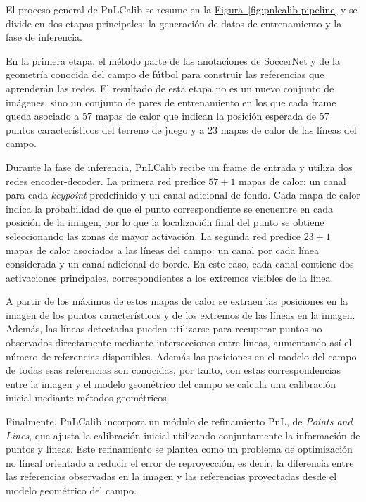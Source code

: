 El proceso general de PnLCalib se resume en la \hyperref[fig:pnlcalib-pipeline]{Figura~\ref*{fig:pnlcalib-pipeline}} y se divide en dos etapas principales: la generación de datos de entrenamiento y la fase de inferencia.

En la primera etapa, el método parte de las anotaciones de SoccerNet y de la geometría conocida del campo de fútbol para construir las referencias que aprenderán las redes. El resultado de esta etapa no es un nuevo conjunto de imágenes, sino un conjunto de pares de entrenamiento en los que cada frame queda asociado a 57 mapas de calor que indican la posición esperada de 57 puntos característicos del terreno de juego y a 23 mapas de calor de las líneas del campo.

Durante la fase de inferencia, PnLCalib recibe un frame de entrada y utiliza dos redes encoder-decoder. La primera red predice $57+1$ mapas de calor: un canal para cada \textit{keypoint} predefinido y un canal adicional de fondo. Cada mapa de calor indica la probabilidad de que el punto correspondiente se encuentre en cada posición de la imagen, por lo que la localización final del punto se obtiene seleccionando las zonas de mayor activación. La segunda red predice $23+1$ mapas de calor asociados a las líneas del campo: un canal por cada línea considerada y un canal adicional de borde. En este caso, cada canal contiene dos activaciones principales, correspondientes a los extremos visibles de la línea.

A partir de los máximos de estos mapas de calor se extraen las posiciones en la imagen de los puntos característicos y de los extremos de las líneas en la imagen. Además, las líneas detectadas pueden utilizarse para recuperar puntos no observados directamente mediante intersecciones entre líneas, aumentando así el número de referencias disponibles. Además las posiciones en el modelo del campo de todas esas referencias son conocidas, por tanto, con estas correspondencias entre la imagen y el modelo geométrico del campo se calcula una calibración inicial mediante métodos geométricos.

Finalmente, PnLCalib incorpora un módulo de refinamiento PnL, de \textit{Points and Lines}, que ajusta la calibración inicial utilizando conjuntamente la información de puntos y líneas. Este refinamiento se plantea como un problema de optimización no lineal orientado a reducir el error de reproyección, es decir, la diferencia entre las referencias observadas en la imagen y las referencias proyectadas desde el modelo geométrico del campo.

